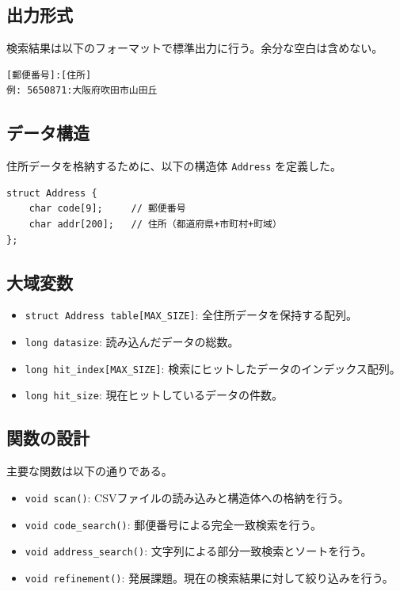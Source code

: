 \documentclass[a4paper,dvipdfmx]{jsarticle}
\begin{document}
\subsection{出力形式}
検索結果は以下のフォーマットで標準出力に行う。余分な空白は含めない。
\begin{verbatim}
[郵便番号]:[住所]
例: 5650871:大阪府吹田市山田丘
\end{verbatim}

\subsection{データ構造}
住所データを格納するために、以下の構造体 \texttt{Address} を定義した。
\begin{verbatim}
struct Address {
    char code[9];     // 郵便番号
    char addr[200];   // 住所（都道府県+市町村+町域）
};
\end{verbatim}

\subsection{大域変数}
\begin{itemize}
    \item \texttt{struct Address table[MAX\_SIZE]}: 全住所データを保持する配列。
    \item \texttt{long datasize}: 読み込んだデータの総数。
    \item \texttt{long hit\_index[MAX\_SIZE]}: 検索にヒットしたデータのインデックス配列。
    \item \texttt{long hit\_size}: 現在ヒットしているデータの件数。
\end{itemize}

\subsection{関数の設計}
主要な関数は以下の通りである。
\begin{itemize}
    \item \texttt{void scan()}: CSVファイルの読み込みと構造体への格納を行う。
    \item \texttt{void code\_search()}: 郵便番号による完全一致検索を行う。
    \item \texttt{void address\_search()}: 文字列による部分一致検索とソートを行う。
    \item \texttt{void refinement()}: 発展課題。現在の検索結果に対して絞り込みを行う。
\end{itemize}
\end{document}
